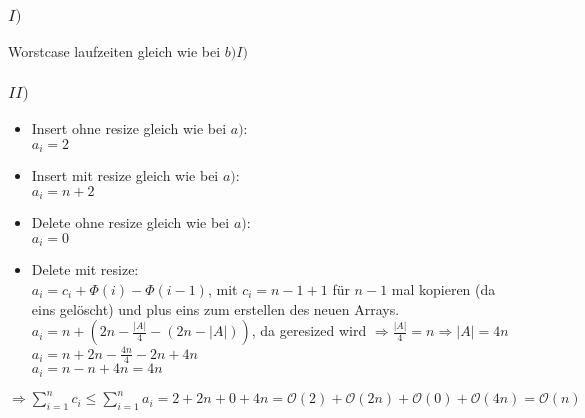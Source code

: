 \documentclass[a4paper]{scrartcl}
\begin{document}
\subsubsection*{$I)$}
Worstcase laufzeiten gleich wie bei $b)I)$
\subsubsection*{$II)$}
\begin{itemize}
	\item Insert ohne resize gleich wie bei $a)$:\\
		$a_i = 2$
	\item  Insert mit resize gleich wie bei $a)$:\\
		$a_i =n+2$	
	\item Delete ohne resize gleich wie bei $a)$:\\
		$a_i = 0$
	\item Delete mit resize:\\
		$a_i = c_i + \Phi(i) - \Phi(i-1)$, mit $c_i = n-1+1$ für $n-1$ mal kopieren (da eins gelöscht) und plus eins zum erstellen des neuen Arrays.\\		
		$a_i = n + (2n - \frac{|A|}{4} - (2n- |A|))$, da geresized wird $\Rightarrow \frac{|A|}{4} = n \Rightarrow |A| = 4n$\\
		$a_i = n + 2n -\frac{4n}{4} -2n + 4n$\\
		$a_i = n -n +4n = 4n$
\end{itemize}
$\Rightarrow \sum_{i=1}^{n} c_i \le \sum_{i=1}^{n} a_i = 2+2n+0+4n = \mathcal{O}(2) + \mathcal{O}(2n) + \mathcal{O}(0) + \mathcal{O}(4n) = \mathcal{O}(n)$
\end{document}
